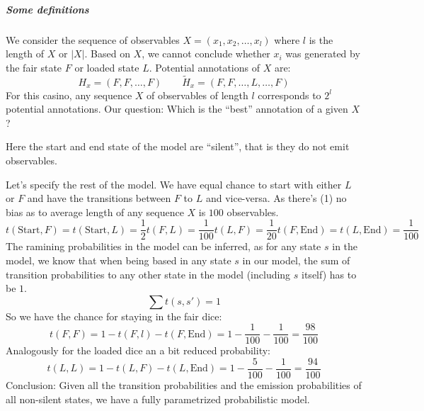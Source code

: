 \subparagraph{Some definitions}

We consider the sequence of observables \(X=(x_1,x_2,\dotsc,x_l)\) where \(l\)
is the length of \(X\) or \(|X|\).
Based on \(X\), we cannot conclude whether \(x_i\) was generated by the fair
state \(F\) or loaded state \(L\).
Potential annotations of \(X\) are:
\[
    H_x=(F,F,\dotsc,F) \qquad \widetilde{H}_x=(F,F,\dotsc,L,\dotsc,F)
\]
For this casino, any sequence \(X\) of observables of length \(l\)
corresponds to \(2^l\) potential annotations.
Our question: Which is the \enquote{best} annotation of a given \(X\)?

\begin{figure}
\centering
{}
\end{figure}
Here the start and end state of the model are \enquote{silent}, that is they do
not emit observables.

Let's specify the rest of the model.  We have equal chance to start with either
\(L\) or \(F\) and have the transitions between \(F\) to \(L\) and vice-versa.
As there's (1) no bias as to average length of any sequence \(X\) is \(100\)
observables.
\[
t(\text{Start},F) = t(\text{Start},L) = \frac{1}{2}
t(F,L) = \frac{1}{100}
t(L,F)=\frac{1}{20}
t(F,\text{End}) = t(L,\text{End}) = \frac{1}{100}
\]
The ramining probabilities in the model can be inferred, as for any state \(s\)
in the model, we know that when being based in any state \(s\) in our model, the
sum of transition probabilities to any other state in the model (including \(s\)
itself) has to be \(1\).
\[
  \sum t(s,s') = 1
\]
So we have the chance for staying in the fair dice:
\[
  t(F,F) = 1 - t(F,l) - t(F,\text{End})
         = 1 - \frac{1}{100} - \frac{1}{100}
         = \frac{98}{100}
\]
Analogously for the loaded dice an a bit reduced probability:
\[
  t(L,L) = 1 - t(L,F) - t(L,\text{End})
         = 1 - \frac{5}{100} - \frac{1}{100}
         = \frac{94}{100}
\]
Conclusion: Given all the transition probabilities and the emission
probabilities of all non-silent states, we have a fully parametrized
probabilistic model.

